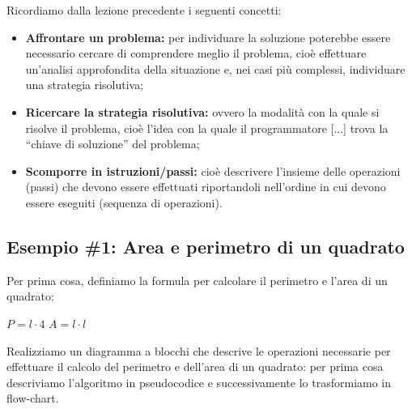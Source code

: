 \documentclass[
    notheorems,
    11pt,
    compress,
    aspectratio=169
]{beamer}
\begin{document}
\begin{frame}


    Ricordiamo dalla lezione precedente \cite{2025IT100} i seguenti concetti:

    \begin{itemize}
        \item \textbf{Affrontare un problema:} per individuare la soluzione poterebbe essere necessario cercare di comprendere meglio il problema, cioè effettuare un’analisi approfondita della situazione e, nei casi più complessi, individuare una strategia risolutiva;

        \pause
        
        \item \textbf{Ricercare la strategia risolutiva:} ovvero la modalità con la quale si risolve il problema, cioè l’idea con la quale il programmatore [...] trova la “chiave di soluzione” del problema;

        \pause
        
        \item \textbf{Scomporre in istruzioni/passi:} cioè descrivere l’insieme delle operazioni (passi) che devono essere effettuati riportandoli nell’ordine in cui devono essere eseguiti (sequenza di operazioni).
    \end{itemize}
\end{frame}


\subsection{Esempio \#1: Area e perimetro di un quadrato}

\begin{frame}

    Per prima cosa, definiamo la formula per calcolare il perimetro e l'area di un quadrato:

    \begin{center}
        \(P = l \cdot4\) \hspace{0.5cm} \(A = l \cdot l\)
    \end{center}


    Realizziamo un diagramma a blocchi che descrive le operazioni necessarie per effettuare il calcolo del perimetro e dell’area di un quadrato: per prima cosa descriviamo l’algoritmo in pseudocodice e successivamente lo trasformiamo in flow-chart.


\end{frame}
\end{document}

